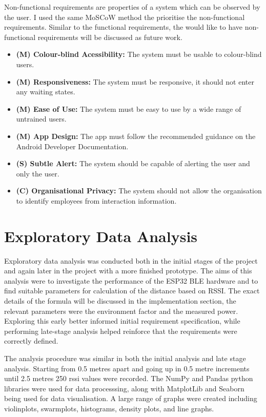 \documentclass{l4proj}
\begin{document}
Non-functional requirements are properties of a system which can be observed by the user. I used the same MoSCoW method the prioritise the non-functional requirements. Similar to the functional requirements, the would like to have non-functional requirements will be discussed as future work.

\begin{itemize}
    \item \textbf{(M) Colour-blind Acessibility: } The system must be usable to colour-blind users.
    \item \textbf{(M) Responsiveness: } The system must be responsive, it should not enter any waiting states.
    \item \textbf{(M) Ease of Use: } The system must be easy to use by a wide range of untrained users.
    \item \textbf{(M) App Design: } The app must follow the recommended guidance on the Android Developer Documentation.
    \item \textbf{(S) Subtle Alert: } The system should be capable of alerting the user and only the user.
    \item \textbf{(C) Organisational Privacy: } The system should not allow the organisation to identify employees from interaction information.
\end{itemize}

\section{Exploratory Data Analysis}

Exploratory data analysis was conducted both in the initial stages of the project and again later in the project with a more finished prototype. The aims of this analysis were to investigate the performance of the ESP32 BLE hardware and to find suitable parameters for calculation of the distance based on RSSI. The exact details of the formula will be discussed in the implementation section, the relevant parameters were the environment factor and the measured power. Exploring this early better informed initial requirement specification, while performing late-stage analysis helped reinforce that the requirements were correctly defined.

The analysis procedure was similar in both the initial analysis and late stage analysis. Starting from 0.5 metres apart and going up in 0.5 metre increments until 2.5 metres 250 rssi values were recorded. The NumPy and Pandas python libraries were used for data processsing, along with MatplotLib and Seaborn being used for data visualisation. A large range of graphs were created including violinplots, swarmplots, histograms, density plots, and line graphs.
\end{document}
